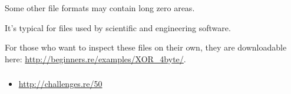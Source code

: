 Some other file formats may contain long zero areas.

It's typical for files used by scientific and engineering software.

For those who want to inspect these files on their own, they are downloadable here: \url{http://beginners.re/examples/XOR_4byte/}.

\subsubsection{\Exercise}

\begin{itemize}
	\item \url{http://challenges.re/50}
\end{itemize}

